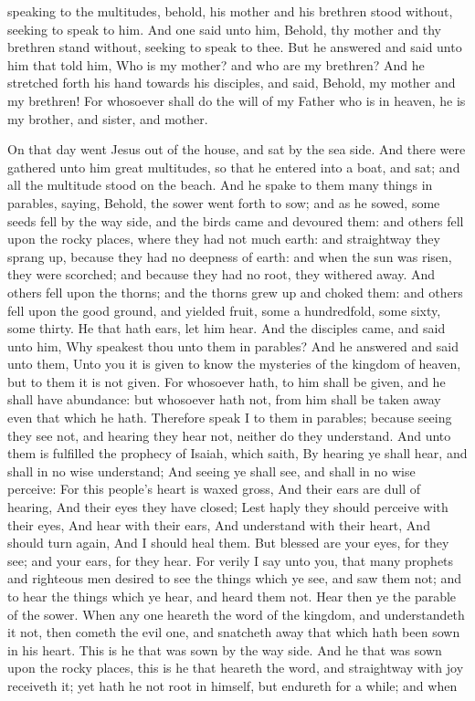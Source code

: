 speaking to the multitudes, behold, his mother and his brethren stood without, seeking to speak to him. And one said unto him, Behold, thy mother and thy brethren stand without, seeking to speak to thee. But he answered and said unto him that told him, Who is my mother? and who are my brethren? And he stretched forth his hand towards his disciples, and said, Behold, my mother and my brethren! For whosoever shall do the will of my Father who is in heaven, he is my brother, and sister, and mother. 

On that day went Jesus out of the house, and sat by the sea side. And there were gathered unto him great multitudes, so that he entered into a boat, and sat; and all the multitude stood on the beach. And he spake to them many things in parables, saying, Behold, the sower went forth to sow; and as he sowed, some seeds fell by the way side, and the birds came and devoured them: and others fell upon the rocky places, where they had not much earth: and straightway they sprang up, because they had no deepness of earth: and when the sun was risen, they were scorched; and because they had no root, they withered away. And others fell upon the thorns; and the thorns grew up and choked them: and others fell upon the good ground, and yielded fruit, some a hundredfold, some sixty, some thirty. He that hath ears, let him hear.  And the disciples came, and said unto him, Why speakest thou unto them in parables? And he answered and said unto them, Unto you it is given to know the mysteries of the kingdom of heaven, but to them it is not given. For whosoever hath, to him shall be given, and he shall have abundance: but whosoever hath not, from him shall be taken away even that which he hath. Therefore speak I to them in parables; because seeing they see not, and hearing they hear not, neither do they understand. And unto them is fulfilled the prophecy of Isaiah, which saith, By hearing ye shall hear, and shall in no wise understand; And seeing ye shall see, and shall in no wise perceive:  For this people’s heart is waxed gross, And their ears are dull of hearing, And their eyes they have closed; Lest haply they should perceive with their eyes, And hear with their ears, And understand with their heart, And should turn again, And I should heal them.  But blessed are your eyes, for they see; and your ears, for they hear. For verily I say unto you, that many prophets and righteous men desired to see the things which ye see, and saw them not; and to hear the things which ye hear, and heard them not. Hear then ye the parable of the sower. When any one heareth the word of the kingdom, and understandeth it not, then cometh the evil one, and snatcheth away that which hath been sown in his heart. This is he that was sown by the way side. And he that was sown upon the rocky places, this is he that heareth the word, and straightway with joy receiveth it; yet hath he not root in himself, but endureth for a while; and when 
